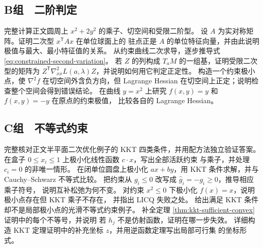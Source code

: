 \subsection*{B组　二阶判定}
\begin{enumerate}[label=\textbf{\thechapter.\arabic*.},resume]
 完整计算正文圆周上 $x^2+2y^2$ 的乘子、切空间和受限二阶型。
 设 $A$ 为实对称矩阵。证明二次型 $x^{\mathsf T}Ax$ 在单位球面上的
 驻点正是 $A$ 的单位特征向量，并由此说明极值与最大、最小特征值的关系。
 从约束曲线二次求导，逐步推导式
 \eqref{eq:constrained-second-variation}。
 若 $Z$ 的列构成 $T_aM$ 的一组基，证明受限二次型的矩阵为
 $Z^{\mathsf T}\nabla^2_{xx}L(a,\lambda)Z$，并说明如何用它判定正定性。
 构造一个约束极小点，使 $\nabla^2 f$ 在切空间外含负方向，但 Lagrange
 Hessian 在切空间上正定；说明检查整个空间会得到错误结论。
 在曲线 $y=x^2$ 上研究 $f(x,y)=y$ 和 $f(x,y)=-y$ 在原点的约束极值，
 比较各自的 Lagrange Hessian。
\end{enumerate}

\subsection*{C组　不等式约束}
\begin{enumerate}[label=\textbf{\thechapter.\arabic*.},resume]
 完整核对正文半平面二次优化例子的 KKT 四类条件，并用配方法独立验证答案。
 在盒子 $0\le x_i\le1$ 上极小化线性函数 $c\cdot x$，写出全部活跃约束
 与乘子，并处理 $c_i=0$ 的非唯一情形。
 在闭单位圆盘上极小化 $ax+by$，用 KKT 条件求解，并与
 Cauchy--Schwarz 不等式比较。
 把约束从 $g_i\le0$ 改写成 $\widehat g_i=-g_i\ge0$，推导相应乘子符号，
 说明互补松弛为何不变。
 对约束 $x^2\le0$ 下极小化 $f(x)=x$，说明极小点存在但 KKT 乘子不存在，
 并指出 LICQ 失败之处。
 给出满足 KKT 条件却不是局部极小点的光滑不等式约束例子。
 补全定理 \ref{thm:kkt-sufficient-convex} 证明中的每个不等号，并说明
 若 $h_j$ 不是仿射函数，证明在哪一步失效。
 详细构造 KKT 定理证明中的补充坐标 $z$，并用逆函数定理写出局部可行集
 的坐标形式。
\end{enumerate}
